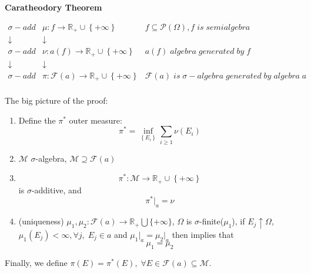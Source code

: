 \setcounter{lecture}{4}

\begin{center}
	\Large \bf Caratheodory Theorem
\end{center}

\vspace{0.25cm}

\begin{theorem}
	\begin{equation}
	\begin{matrix}
	{\sigma-add} & {\mu :f \to {\mathbb{R}_ + } \cup \left\{ { + \infty } \right\}} & {f \subseteq \mathcal{P}\left( \Omega  \right),f\;is\;semialgebra}  \\ 
	\downarrow  &  \downarrow  & {}  \\ 
	{\sigma-add} & {\nu :a\left( f \right) \to {\mathbb{R}_ + } \cup \left\{ { + \infty } \right\}} & {a\left( f \right)\;algebra \; generated \; by \; f}  \\ 
	\downarrow  &  \downarrow  & {}  \\ 
	{\sigma-add} & {\pi :\mathcal{F}\left( a \right) \to {\mathbb{R}_ + } \cup \left\{ { + \infty } \right\}} & {\mathcal{F}\left( a \right)\; is \; \sigma-algebra\;generated\;by\;algebra\; a}  \\ 
	\end{matrix}
	\label{eq4.1} 
	\end{equation}
	\label{CaratheodoryTheorem}
\end{theorem}

The big picture of the proof:
\begin{enumerate}
	\item  Define the $ {\pi ^*} $ outer measure:
	\begin{equation}
	{\pi ^*} = \mathop {\inf }\limits_{\left\{ {{E_i}} \right\}} \sum\limits_{i \geqslant 1} {\nu \left( {{E_i}} \right)} 
	\label{eq4.2} 
	\end{equation}
	\item  $ \mathcal{M} $ $ \sigma $-algebra, $ \mathcal{M} \supseteq \mathcal{F}\left(a\right) $
	\item 
	\begin{equation}
	{\pi ^*}:\mathcal{M} \to {\mathbb{R}_ + } \cup \left\{ { + \infty } \right\}
	\label{eq4.3} 
	\end{equation}
	is $ \sigma $-additive, and 
	\begin{equation}
	{\pi ^*}{|_a} = \nu
	\label{eq4.4} 
	\end{equation}
	\item (uniqueness) $ \mu_{1},\mu_{2}: \mathcal{F}\left(a\right) \to \mathbb{R}_{+}\bigcup \{+\infty\} $, $ \Omega $ is $ \sigma $-finite($ \mu_{1} $), if $  E_{j} \uparrow \Omega $, ${\mu _1}\left( {{E_j}} \right) < \infty ,\forall j,\;{E_j} \in a$ and ${\mu _1}{|_a} = {\mu _2}{|_a}$ then implies that
	\begin{equation}
	{\mu _1} = {\mu _2}
	\label{eq4.5} 
	\end{equation}
\end{enumerate}
Finally, we define  $\pi \left( E \right) = {\pi ^*}\left( E \right),\;\forall E \in \mathcal{F}\left( a \right) \subseteq \mathcal{M}$.
 
